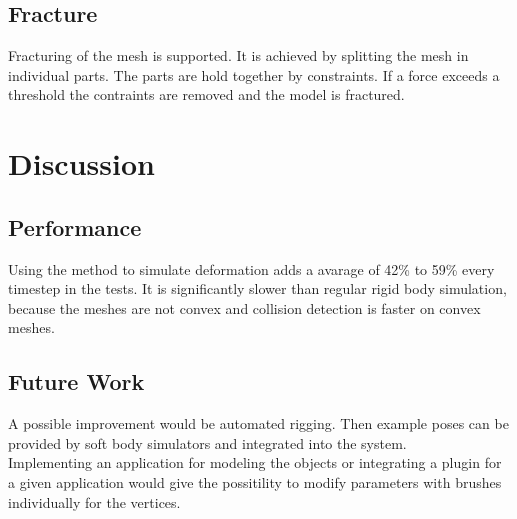 \documentclass[
	11pt, 
	DIV10,
	a4paper, 
	oneside, 
	headings=normal, 
	captions=tableheading,
	final, 
	numbers=noenddot
]{scrartcl}
\begin{document}
\subsection{Fracture}
Fracturing of the mesh is supported. It is achieved by splitting the mesh in individual parts. The parts are hold together by constraints. If a force exceeds a threshold the contraints are removed and the model is fractured.
\section{Discussion}
\subsection{Performance}
Using the method to simulate deformation adds a avarage of 42\% to 59\% every timestep in the tests. It is significantly slower than regular rigid body simulation, because the meshes are not convex and collision detection is faster on convex meshes.
\subsection{Future Work}
A possible improvement would be automated rigging. Then example poses can be provided by soft body simulators and integrated into the system.\\
Implementing an application for modeling the objects or integrating a plugin for a given application would give the possitility to modify parameters with brushes individually for the vertices.





\end{document}
